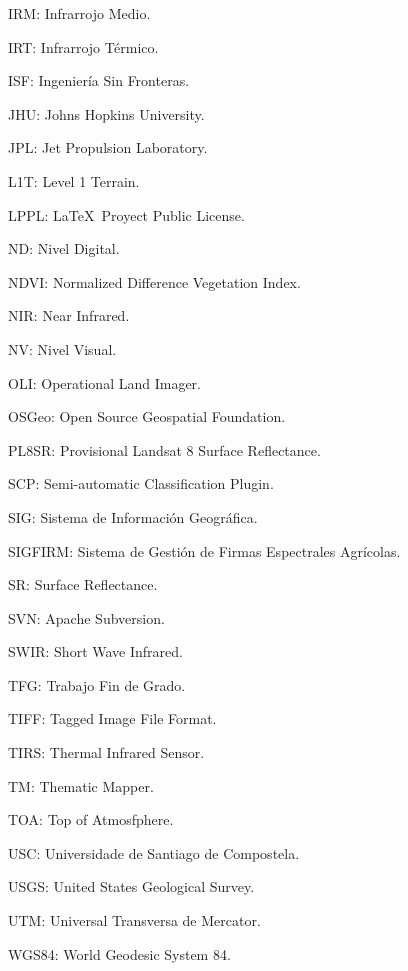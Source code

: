 IRM: Infrarrojo Medio.

IRT: Infrarrojo Térmico.

ISF: Ingeniería Sin Fronteras.

JHU: Johns Hopkins University.

JPL: Jet Propulsion Laboratory.

L1T: Level 1 Terrain.

LPPL: \LaTeX\ Proyect Public License.

ND: Nivel Digital.

NDVI: Normalized Difference Vegetation Index.

NIR: Near Infrared.

NV: Nivel Visual.

OLI: Operational Land Imager.

OSGeo: Open Source Geospatial Foundation.

PL8SR: Provisional Landsat 8 Surface Reflectance.

SCP: Semi-automatic Classification Plugin.

SIG: Sistema de Información Geográfica.

SIGFIRM: Sistema de Gestión de Firmas Espectrales Agrícolas.

SR: Surface Reflectance.

SVN: Apache Subversion.

SWIR: Short Wave Infrared.

TFG: Trabajo Fin de Grado.

TIFF: Tagged Image File Format.

TIRS: Thermal Infrared Sensor.

TM: Thematic Mapper.

TOA: Top of Atmosfphere.

USC: Universidade de Santiago de Compostela.

USGS: United States Geological Survey.

UTM: Universal Transversa de Mercator.

WGS84: World Geodesic System 84.